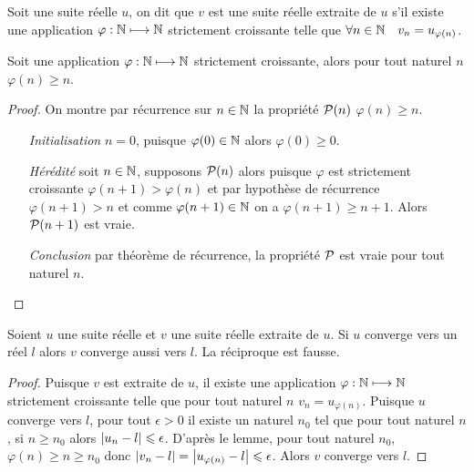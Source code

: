 \begin{defdef}
    Soit une suite réelle \(u\), on dit que \(v\) est une suite réelle extraite de
    \(u\) s'il existe une application \(\varphi:\N \longmapsto \N\) strictement
    croissante telle que \(\forall n\in \N \quad v_n = u_{\varphi(n)}\).
\end{defdef}
\begin{lemme}
    Soit une application \(\varphi:\N \longmapsto \N\) strictement croissante,
    alors pour tout naturel \(n\) \(\varphi(n) \geqslant n\).
\end{lemme}
\begin{proof}
    On montre par récurrence sur \(n \in \N\) la propriété \(\P(n)\) \(\varphi(n)
    \geqslant n\).
    \begin{itemize}
        \item[\emph{Initialisation}] \(n = 0\), puisque \(\varphi(0) \in \N\) alors
            \(\varphi(0) \geqslant 0\).
        \item[\emph{Hérédité}] soit \(n \in \N\), supposons \(\P(n)\) alors puisque
            \(\varphi\) est strictement croissante \(\varphi(n+1) > \varphi(n)\) et
            par hypothèse de récurrence \(\varphi(n+1) > n\) et comme \(\varphi(n+1)
            \in \N\) on a \(\varphi(n+1) \geqslant n+1\). Alors \(\P(n+1)\) est vraie.
        \item[\emph{Conclusion}] par théorème de récurrence, la propriété \(\P\) est
            vraie pour tout naturel \(n\).
    \end{itemize}
\end{proof}
\begin{prop}
    Soient \(u\) une suite réelle et \(v\) une suite réelle extraite de \(u\). Si
    \(u\) converge vers un réel \(l\) alors \(v\) converge aussi vers \(l\). La
    réciproque est fausse.
\end{prop}
\begin{proof}
    Puisque \(v\) est extraite de \(u\), il existe une application \(\varphi:\N
    \longmapsto \N\) strictement croissante telle que pour tout naturel \(n\)
    \(v_n = u_{\varphi(n)}\). Puisque \(u\) converge vers \(l\), pour tout
    \(\epsilon>0\) il existe un naturel \(n_0\) tel que pour tout naturel \(n\),
    si \(n \geqslant n_0\) alors \(\abs{u_n-l} \leqslant \epsilon\). D'après le
    lemme, pour tout naturel \(n_0\), \(\varphi(n) \geqslant n \geqslant n_0\)
    donc \(\abs{v_n-l} = \abs{u_{\varphi(n)}-l} \leqslant \epsilon\). Alors \(v\)
    converge vers \(l\).
\end{proof}

